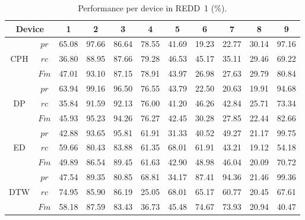\begin{table}
\caption{Performance per device in REDD~1 ($\%$).}\label{table:SR9}
\begin{center}
\begin{tabular}{|c|c|c|c|c|c|c|c|c|c|c|}
\hline
\multicolumn{2}{|c|}{Device}& 1&2&3&4&5&6&7&8&9\\
\hline
\multirow{3}{*}{CPH} & $pr$ &65.08 &97.66 &86.64 &78.55 &41.69 &19.23 &22.77 &30.14 &97.16 \\
& $rc$ & 36.80&88.95 &87.66 &79.28 &46.53 &45.17 &35.11 &29.46 &69.22  \\
& $Fm$ &47.01 &93.10 &87.15 &78.91 &43.97 &26.98 &27.63 &29.79 &80.84 \\
\hline
\multirow{3}{*}{DP} & $pr$ & 63.94&99.16 &96.50 &76.55 &43.79 &22.50 &20.63 &19.91 &94.68 \\
& $rc$ &35.84 &91.59 &92.13 &76.00 &41.20 &46.26 &42.84 &25.71 &73.34  \\
& $Fm$ &45.93 &95.23 &94.26 &76.27 &42.45 &30.28 &27.85 &22.44 &82.66 \\
\hline
\multirow{3}{*}{ED} & $pr$ &42.88 &93.65 &95.81 &61.91 &31.33 &40.52 &49.27 &21.17 &99.75 \\
& $rc$ &59.66 &80.43 &83.88 &61.35 &68.01 &61.91 &43.21 &19.12 &54.18  \\
& $Fm$ &49.89 & 86.54 & 89.45 & 61.63 &42.90 & 48.98 &46.04 & 20.09 & 70.72 \\
\hline
\multirow{3}{*}{DTW} & $pr$ &47.54 &89.35 &80.85 &68.81 &34.17 &87.41 &94.36 &21.46 &99.36 \\
& $rc$ &74.95 &85.90 &86.19 & 25.05&68.01 &65.17 &60.77 &20.45 &67.61  \\
& $Fm$ &58.18 &87.59 &83.43 &36.73 &45.48 &74.67 &73.93 &20.94 &40.47 \\
\hline
\end{tabular}
\end{center}
\end{table}

